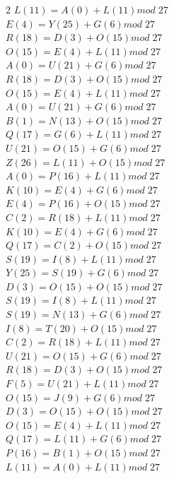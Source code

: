 \documentclass{article}
\begin{document}
\begin{enumerate}
\begin{multicols}{2}
$L (11) = A(0) + L (11) mod \; 27$ \\
$E (4) = Y(25) + G (6) mod \; 27$ \\
$R (18) = D(3) + O (15) mod \; 27$ \\
$O (15) = E(4) + L (11) mod \; 27$ \\
$A (0) = U(21) + G (6) mod \; 27$ \\
$R (18) = D(3) + O (15) mod \; 27$ \\
$O (15) = E(4) + L (11) mod \; 27$ \\
$A (0) = U(21) + G (6) mod \; 27$ \\
$B (1) = N(13) + O (15) mod \; 27$ \\
$Q (17) = G(6) + L (11) mod \; 27$ \\
$U (21) = O(15) + G (6) mod \; 27$ \\
$Z (26) = L(11) + O (15) mod \; 27$ \\
$A (0) = P(16) + L (11) mod \; 27$ \\
$K (10) = E(4) + G (6) mod \; 27$ \\
$E (4) = P(16) + O (15) mod \; 27$ \\
$C (2) = R(18) + L (11) mod \; 27$ \\
$K (10) = E(4) + G (6) mod \; 27$ \\
$Q (17) = C(2) + O (15) mod \; 27$ \\
$S (19) = I(8) + L (11) mod \; 27$ \\
$Y (25) = S(19) + G (6) mod \; 27$ \\
$D (3) = O(15) + O (15) mod \; 27$ \\
$S (19) = I(8) + L (11) mod \; 27$ \\
$S (19) = N(13) + G (6) mod \; 27$ \\
$I (8) = T(20) + O (15) mod \; 27$ \\
$C (2) = R(18) + L (11) mod \; 27$ \\
$U (21) = O(15) + G (6) mod \; 27$ \\
$R (18) = D(3) + O (15) mod \; 27$ \\
$F (5) = U(21) + L (11) mod \; 27$ \\
$O (15) = J(9) + G (6) mod \; 27$ \\
$D (3) = O(15) + O (15) mod \; 27$ \\
$O (15) = E(4) + L (11) mod \; 27$ \\
$Q (17) = L(11) + G (6) mod \; 27$ \\
$P (16) = B(1) + O (15) mod \; 27$ \\
$L (11) = A(0) + L (11) mod \; 27$ \\

\end{multicols}
\end{enumerate}
\end{document}
